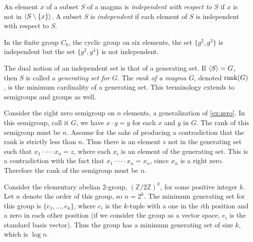 An element $x$ of a subset $S$ of a magma is \emph{independent with respect to $S$} if $x$ is not in $\langle S \setminus \{x\} \rangle$.
A subset $S$ is \emph{independent} if each element of $S$ is independent with respect to $S$.

\begin{example}
  In the finite group $C_6$, the cyclic group on six elements, the set $\{g^2, g^3\}$ is independent but the set $\{g^2, g^4\}$ is not independent.
\end{example}

The dual notion of an independent set is that of a generating set.
If $\langle S \rangle = G$, then $S$ is called a \emph{generating set for $G$}.
The \emph{rank of a magma $G$}, denoted $\operatorname{rank}(G)$, is the minimum cardinality of a generating set.
This terminology extends to semigroups and groups as well.

\begin{example}\label{ex:semigroupgen}
  Consider the right zero semigroup on $n$ elements, a generalization of \autoref{ex:zero}.
  In this semigroup, call it $G$, we have $x \cdot y = y$ for each $x$ and $y$ in $G$.
  The rank of this semigroup must be $n$.
  Assume for the sake of producing a contradiction that the rank is strictly less than $n$.
  Thus there is an element $z$ not in the generating set such that $x_1 \cdot \dotsb \cdot x_n = z$, where each $x_i$ is an element of the generating set.
  This is a contradiction with the fact that $x_1 \cdot \dotsb \cdot x_n = x_n$, since $x_n$ is a right zero.
  Therefore the rank of the semigroup must be $n$.
\end{example}

\begin{example}\label{ex:elementary}
  Consider the elementary abelian $2$-group, $(\mathbb{Z} / 2 \mathbb{Z})^k$, for some positive integer $k$.
  Let $n$ denote the order of this group, so $n = 2^k$.
  The minimum generating set for this group is $\{e_1, \dotsc, e_k\}$, where $e_i$ is the $k$-tuple with a one in the $i$th position and a zero in each other position (if we consider the group as a vector space, $e_i$ is the standard basis vector).
  Thus the group has a minimum generating set of size $k$, which is $\log n$.
\end{example}

